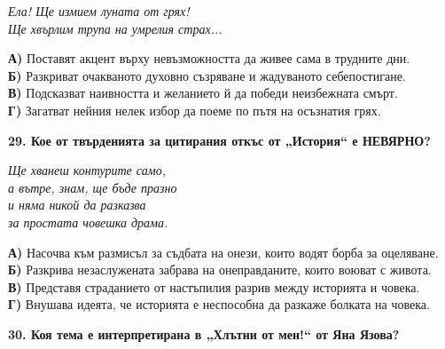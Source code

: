 \documentclass[12pt,a4paper]{article}
\begin{document}
\vspace{0.2cm}

\noindent
\textit{Ела! Ще измием луната от грях!\\
Ще хвърлим трупа на умрелия страх...}

\vspace{0.3cm}

\noindent
\textbf{А)} Поставят акцент върху невъзможността да живее сама в трудните дни.
\\
\noindent
\textbf{Б)} Разкриват очакваното духовно съзряване и жадуваното себепостигане.
\\
\noindent
\textbf{В)} Подсказват наивността и желанието й да победи неизбежната смърт.
\\
\noindent
\textbf{Г)} Загатват нейния нелек избор да поеме по пътя на осъзнатия грях.

\vspace{0.6cm}

\noindent
\textbf{29. Кое от твърденията за цитирания откъс от „История“ е НЕВЯРНО?}

\vspace{0.2cm}

\noindent
\textit{Ще хванеш контурите само,\\
а вътре, знам, ще бъде празно\\
и няма никой да разказва\\
за простата човешка драма.}

\vspace{0.3cm}

\noindent
\textbf{А)} Насочва към размисъл за съдбата на онези, които водят борба за оцеляване.
\\
\noindent
\textbf{Б)} Разкрива незаслужената забрава на онеправданите, които воюват с живота.
\\
\noindent
\textbf{В)} Представя страданието от настъпилия разрив между историята и човека.
\\
\noindent
\textbf{Г)} Внушава идеята, че историята е неспособна да разкаже болката на човека.

\vspace{0.6cm}

\noindent
\textbf{30. Коя тема е интерпретирана в „Хлътни от мен!“ от Яна Язова?}

\vspace{0.2cm}
\end{document}
